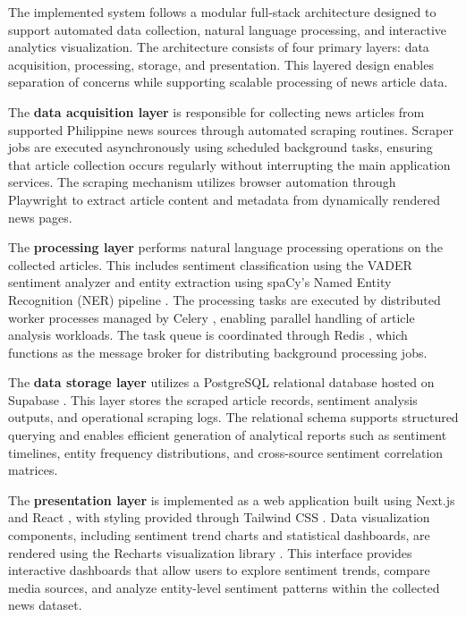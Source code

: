 {{{{{{{{{{The implemented system follows a modular full-stack architecture designed to support automated data collection, natural language processing, and interactive analytics visualization. The architecture consists of four primary layers: data acquisition, processing, storage, and presentation. This layered design enables separation of concerns while supporting scalable processing of news article data.



The \textbf{data acquisition layer} is responsible for collecting news articles from supported Philippine news sources through automated scraping routines. Scraper jobs are executed asynchronously using scheduled background tasks, ensuring that article collection occurs regularly without interrupting the main application services. The scraping mechanism utilizes browser automation through Playwright \cite{ref30} to extract article content and metadata from dynamically rendered news pages.

The \textbf{processing layer} performs natural language processing operations on the collected articles. This includes sentiment classification using the VADER sentiment analyzer \cite{ref08} and entity extraction using spaCy's Named Entity Recognition (NER) pipeline \cite{ref26}. The processing tasks are executed by distributed worker processes managed by Celery \cite{ref29}, enabling parallel handling of article analysis workloads. The task queue is coordinated through Redis \cite{ref15}, which functions as the message broker for distributing background processing jobs.

The \textbf{data storage layer} utilizes a PostgreSQL relational database \cite{ref06} hosted on Supabase \cite{ref19}. This layer stores the scraped article records, sentiment analysis outputs, and operational scraping logs. The relational schema supports structured querying and enables efficient generation of analytical reports such as sentiment timelines, entity frequency distributions, and cross-source sentiment correlation matrices.

The \textbf{presentation layer} is implemented as a web application built using Next.js \cite{ref31} and React \cite{ref32}, with styling provided through Tailwind CSS \cite{ref33}. Data visualization components, including sentiment trend charts and statistical dashboards, are rendered using the Recharts visualization library \cite{ref34}. This interface provides interactive dashboards that allow users to explore sentiment trends, compare media sources, and analyze entity-level sentiment patterns within the collected news dataset.

}}}}}}}}}}
